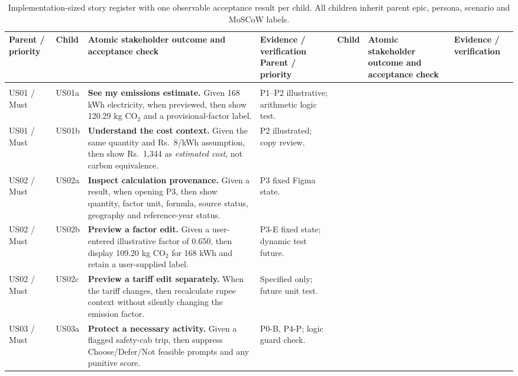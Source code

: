 \documentclass[12pt,a4paper]{article}
\renewcommand{\arraystretch}{1.28}
\begin{document}
\begingroup
\footnotesize
\renewcommand{\arraystretch}{1.26}
\setlength{\tabcolsep}{4pt}
\begin{longtable}{@{}>{\raggedright\arraybackslash}p{1.75cm}>{\raggedright\arraybackslash}p{1.07cm}>{\raggedright\arraybackslash}p{6.45cm}>{\raggedright\arraybackslash}p{3.3cm}@{}}
\caption{Implementation-sized story register with one observable acceptance result per child. All children inherit parent epic, persona, scenario and MoSCoW labels.}\label{tab:atomic-stories}\\
\toprule
{}\textbf{Parent / priority} & \textbf{Child} & \textbf{Atomic stakeholder outcome and acceptance check} & \textbf{Evidence / verification}\endfirsthead
\toprule{}\textbf{Parent / priority} & \textbf{Child} & \textbf{Atomic stakeholder outcome and acceptance check} & \textbf{Evidence / verification}\\\midrule\endhead
\midrule{}\\\endfoot
\bottomrule\endlastfoot
US01 / Must & US01a & \textbf{See my emissions estimate.} Given 168 kWh electricity, when previewed, then show 120.29 kg CO$_2$ and a provisional-factor label. & P1--P2 illustrative; arithmetic logic test.\\
US01 / Must & US01b & \textbf{Understand the cost context.} Given the same quantity and Rs.~8/kWh assumption, then show Rs.~1,344 as \emph{estimated cost}, not carbon equivalence. & P2 illustrated; copy review.\\
US02 / Must & US02a & \textbf{Inspect calculation provenance.} Given a result, when opening P3, then show quantity, factor unit, formula, source status, geography and reference-year status. & P3 fixed Figma state.\\
US02 / Must & US02b & \textbf{Preview a factor edit.} Given a user-entered illustrative factor of 0.650, then display 109.20 kg CO$_2$ for 168 kWh and retain a user-supplied label. & P3-E fixed state; dynamic test future.\\
US02 / Must & US02c & \textbf{Preview a tariff edit separately.} When the tariff changes, then recalculate rupee context without silently changing the emission factor. & Specified only; future unit test.\\
US03 / Must & US03a & \textbf{Protect a necessary activity.} Given a flagged safety-cab trip, then suppress Choose/Defer/Not feasible prompts and any punitive score. & P0-B, P4-P; logic guard check.\\

\end{longtable}
\end{document}

